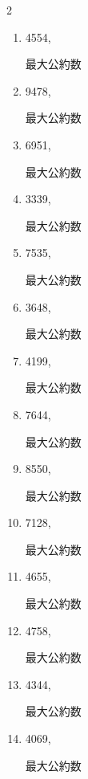 \begin{multicols}{2}
\begin{enumerate}
        最大公約数

\columnbreak %

  \item 4554,

        最大公約数

  \item 9478,

        最大公約数

  \item 6951,

        最大公約数

  \item 3339,

        最大公約数

  \item 7535,

        最大公約数

\columnbreak %

\resetques

  \item 3648,

        最大公約数

  \item 4199,

        最大公約数

  \item 7644,

        最大公約数

  \item 8550,

        最大公約数

  \item 7128,

        最大公約数

\columnbreak %

  \item 4655,

        最大公約数

  \item 4758,

        最大公約数

  \item 4344,

        最大公約数

  \item 4069,

        最大公約数


\end{enumerate}
\end{multicols}
